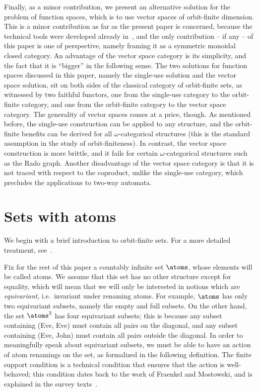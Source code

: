 Finally, as a minor contribution, we present an alternative solution for the problem of function spaces, which is  to use vector spaces of orbit-finite dimension. This is a minor contribution as far as the present paper is concerned, because the technical tools were developed already in~\cite{bojanczykKM21OrbitFiniteVector}, and the only contribution -- if any -- of this paper is one of perspective, namely framing it as a symmetric monoidal closed category. An advantage of the vector space category is its simplicity, and the fact that it is ``bigger'' in the following sense. The two solutions for function spaces discussed in this paper, namely the single-use solution and the vector space solution, sit on both sides of the classical category of orbit-finite sets, as witnessed by two faithful functors, one from the single-use category to the orbit-finite category, and one from the orbit-finite category to the vector space category. 
The generality of vector spaces comes at a price, though. As mentioned before, the single-use construction can be applied to any structure, and the orbit-finite benefits can be derived for all $\omega$-categorical structures (this is the standard assumption in the study of orbit-finiteness). In contrast, the vector space construction is more brittle, and it fails for certain $\omega$-categorical  structures such as the Rado graph.   Another disadvantage of the vector space category is that it is not traced with respect to the coproduct, unlike the single-use category, which precludes the applications to two-way automata.
\section{Sets with atoms}
We begin  with  a brief introduction to orbit-finite sets. For a more detailed treatment, see~\cite{bojanczyk_slightly2018}.

Fix for the rest of this paper a countably infinite set $\atoms$, whose elements will be called atoms.  We assume that this set has no other structure except for equality, which will mean that we will only be interested in notions which are \emph{equivariant}, i.e.~invariant under renaming atoms. For example, $\atoms$ has only two equivariant subsets, namely the empty and full subsets. On the other hand, the set $\atoms^2$ has four equivariant subsets; this is because any subset containing (Eve, Eve) must contain all pairs on the diagonal, and any subset containing (Eve, John) must contain all pairs outside the diagonal.  In order to meaningfully speak about equivariant subsets, we must be able to have an action of atom renamings on the set, as formalized in the following definition. The finite support condition is a technical condition that ensures that the action is well-behaved; this condition dates back to the work of Fraenkel and Mostowski, and is explained in the survey texts~\cite{PittsAM:nomsns,bojanczyk_slightly2018}.


